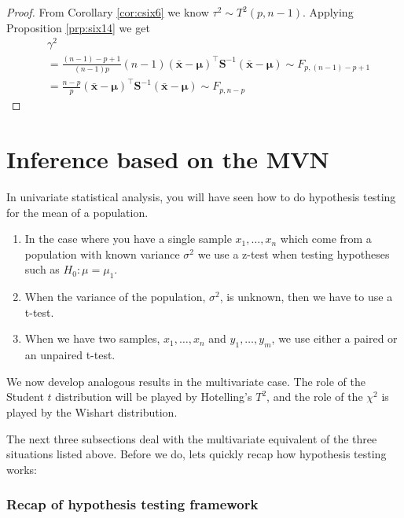 \documentclass[]{book}
\theoremstyle{definition}
\theoremstyle{definition}
\theoremstyle{definition}
\theoremstyle{remark}
\begin{document}
\begin{proof}
{}From Corollary \ref{cor:csix6} we know \(\tau^2 \sim T^2(p,n-1)\). Applying Proposition \ref{prp:six14} we get
\begin{align*}
&\gamma^2\\
& = \frac{(n-1)-p+1}{(n-1)p}(n-1)(\bar{\boldsymbol x}-\boldsymbol \mu)^\top \boldsymbol S^{-1} (\bar{\boldsymbol x}-\boldsymbol \mu) \sim F_{p,(n-1)-p+1} \\
&= \frac{n-p}{p}(\bar{\boldsymbol x}-\boldsymbol \mu)^\top \boldsymbol S^{-1} (\bar{\boldsymbol x}-\boldsymbol \mu) \sim F_{p,n-p}
\end{align*}
\end{proof}

\hypertarget{inference-based-on-the-mvn}{%
\section{Inference based on the MVN}\label{inference-based-on-the-mvn}}

In univariate statistical analysis, you will have seen how to do hypothesis testing for the mean of a population.

\begin{enumerate}
\def\labelenumi{\arabic{enumi}.}
\item
  In the case where you have a single sample \(x_1, \ldots, x_n\) which come from a population with known variance \(\sigma^2\) we use a z-test when testing hypotheses such as
  \(H_0: \mu=\mu_1\).
\item
  When the variance of the population, \(\sigma^2\), is unknown, then we have to use a t-test.
\item
  When we have two samples, \(x_1, \ldots, x_n\) and \(y_1, \ldots, y_m\), we use either a paired or an unpaired t-test.
\end{enumerate}

We now develop analogous results in the multivariate case. The role of the Student \(t\) distribution will be played by Hotelling's \(T^2\), and the role of the \(\chi^2\) is played by the Wishart distribution.

The next three subsections deal with the multivariate equivalent of the three situations listed above. Before we do, lets quickly recap how hypothesis testing works:

\hypertarget{recap-of-hypothesis-testing-framework}{%
\subsubsection*{Recap of hypothesis testing framework}\label{recap-of-hypothesis-testing-framework}}
\end{document}
